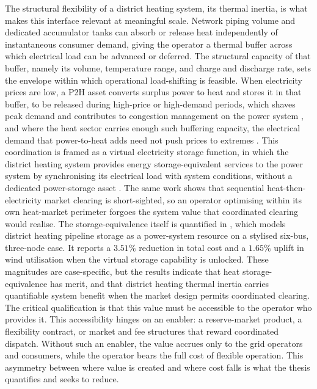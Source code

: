 The structural flexibility of a district heating system, its thermal inertia, is what makes this interface relevant at meaningful scale. Network piping volume and dedicated accumulator tanks can absorb or release heat independently of instantaneous consumer demand, giving the operator a thermal buffer across which electrical load can be advanced or deferred. The structural capacity of that buffer, namely its volume, temperature range, and charge and discharge rate, sets the envelope within which operational load-shifting is feasible. When electricity prices are low, a P2H asset converts surplus power to heat and stores it in that buffer, to be released during high-price or high-demand periods, which shaves peak demand and contributes to congestion management on the power system \cite{golmohamadi_integration_2022}, and where the heat sector carries enough such buffering capacity, the electrical demand that power-to-heat adds need not push prices to extremes \cite{bloes_power--heat_2018}. This coordination is framed as a virtual electricity storage function, in which the district heating system provides energy storage-equivalent services to the power system by synchronising its electrical load with system conditions, without a dedicated power-storage asset \cite{mitridati_heat_2020}. The same work shows that sequential heat-then-electricity market clearing is short-sighted, so an operator optimising within its own heat-market perimeter forgoes the system value that coordinated clearing would realise. The storage-equivalence itself is quantified in \cite{mitridati_power_2018}, which models district heating pipeline storage as a power-system resource on a stylised six-bus, three-node case. It reports a $3.51\%$ reduction in total cost and a $1.65\%$ uplift in wind utilisation when the virtual storage capability is unlocked. These magnitudes are case-specific, but the results indicate that heat storage-equivalence has merit, and that district heating thermal inertia carries quantifiable system benefit when the market design permits coordinated clearing. The critical qualification is that this value must be accessible to the operator who provides it. This accessibility hinges on an enabler: a reserve-market product, a flexibility contract, or market and fee structures that reward coordinated dispatch. Without such an enabler, the value accrues only to the grid operators and consumers, while the operator bears the full cost of flexible operation. This asymmetry between where value is created and where cost falls is what the thesis quantifies and seeks to reduce. 

